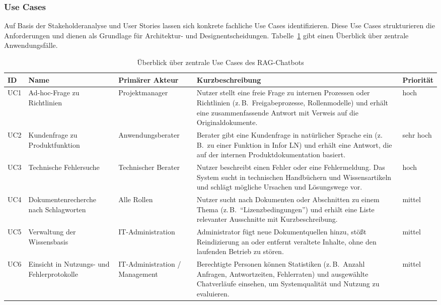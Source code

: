\subsubsection{Use Cases}\label{subsubsec:use-cases}

Auf Basis der Stakeholderanalyse und User Stories lassen sich konkrete fachliche Use Cases identifizieren.
Diese Use Cases strukturieren die Anforderungen und dienen als Grundlage für Architektur- und Designentscheidungen.
Tabelle~\ref{tab:use-cases} gibt einen Überblick über zentrale Anwendungsfälle.
\vspace{1cm}
\FloatBarrier
\begin{table}[htbp]
    \centering
    \small
    \begin{tabular}{p{1.2cm}p{3.4cm}p{3cm}p{5cm}p{1.6cm}}
        \toprule
        \textbf{ID} & \textbf{Name} & \textbf{Primärer Akteur} & \textbf{Kurzbeschreibung} & \textbf{Priorität} \\
        \midrule
        UC1 & Ad-hoc-Frage zu Richtlinien & Projektmanager &
        Nutzer stellt eine freie Frage zu internen Prozessen oder Richtlinien (z.\,B.\ Freigabeprozesse, Rollenmodelle) und erhält eine zusammenfassende Antwort mit Verweis auf die Originaldokumente. & hoch \\
        \addlinespace
        UC2 & Kundenfrage zu Produktfunktion & Anwendungsberater &
        Berater gibt eine Kundenfrage in natürlicher Sprache ein (z.\,B.\ zu einer Funktion in Infor LN) und erhält eine Antwort, die auf der internen Produktdokumentation basiert. & sehr hoch \\
        \addlinespace
        UC3 & Technische Fehlersuche & Technischer Berater &
        Nutzer beschreibt einen Fehler oder eine Fehlermeldung.
        Das System sucht in technischen Handbüchern und Wissensartikeln und schlägt mögliche Ursachen und Lösungswege vor. & hoch \\
        \addlinespace
        UC4 & Dokumentenrecherche nach Schlagworten & Alle Rollen &
        Nutzer sucht nach Dokumenten oder Abschnitten zu einem Thema (z.\,B.\ \enquote{Lizenzbedingungen}) und erhält eine Liste relevanter Ausschnitte mit Kurzbeschreibung. & mittel \\
        \addlinespace
        UC5 & Verwaltung der Wissensbasis & IT-Administration &
        Administrator fügt neue Dokumentquellen hinzu, stößt Reindizierung an oder entfernt veraltete Inhalte, ohne den laufenden Betrieb zu stören. & mittel \\
        \addlinespace
        UC6 & Einsicht in Nutzungs- und Fehlerprotokolle & IT-Administration / Management &
        Berechtigte Personen können Statistiken (z.\,B.\ Anzahl Anfragen, Antwortzeiten, Fehlerraten) und ausgewählte Chatverläufe einsehen, um Systemqualität und Nutzung zu evaluieren. & mittel \\
        \bottomrule
    \end{tabular}
    \caption{Überblick über zentrale Use Cases des RAG-Chatbots}
    \label{tab:use-cases}
\end{table}

